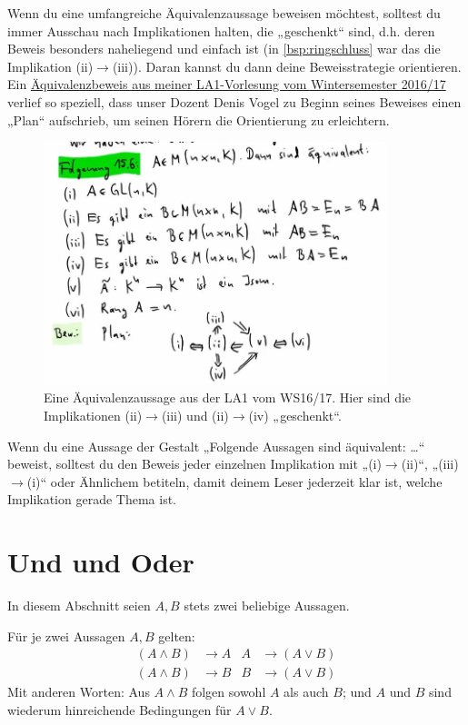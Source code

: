 \begin{bem}
    Wenn du eine umfangreiche Äquivalenzaussage beweisen möchtest, solltest du immer Ausschau nach Implikationen halten, die „geschenkt“ sind, d.h. deren Beweis besonders naheliegend und einfach ist (in \cref{bsp:ringschluss} war das die Implikation (ii)$\to$(iii)). Daran kannst du dann deine Beweisstrategie orientieren. Ein \href{https://mampf.mathi.uni-heidelberg.de/media/105/play?time=2609}{Äquivalenzbeweis aus meiner LA1-Vorlesung vom Wintersemester 2016/17} verlief so speziell, dass unser Dozent Denis Vogel zu Beginn seines Beweises einen „Plan“ aufschrieb, um seinen Hörern die Orientierung zu erleichtern.
    \begin{figure}[ht]
        \includegraphics[width=10cm]{./_img/equivbeweis.jpeg}
        \centering \caption{Eine Äquivalenzaussage aus der LA1 vom WS16/17. Hier sind die Implikationen (ii)$\to$(iii) und (ii)$\to$(iv) „geschenkt“.}
    \end{figure}
\end{bem}


\begin{bem}
    Wenn du eine Aussage der Gestalt „Folgende Aussagen sind äquivalent: \dots“ beweist, solltest du den Beweis jeder einzelnen Implikation mit „(i)$\to$(ii)“, „(iii)$\to$(i)“ oder Ähnlichem betiteln, damit deinem Leser jederzeit klar ist, welche Implikation gerade Thema ist.
\end{bem}





\section{Und und Oder}


In diesem Abschnitt seien $A,B$ stets zwei beliebige Aussagen.


\begin{axiom}[*]\label{undoderaxiome}
    Für je zwei Aussagen $A,B$ gelten:
    \begin{align*}
        (A\land B) & \to A & A & \to (A\lor B) \\
        (A\land B) & \to B & B & \to (A\lor B)
    \end{align*}
    Mit anderen Worten: Aus $A\land B$ folgen sowohl $A$ als auch $B$; und $A$ und $B$ sind wiederum hinreichende Bedingungen für $A\lor B$.
\end{axiom}


